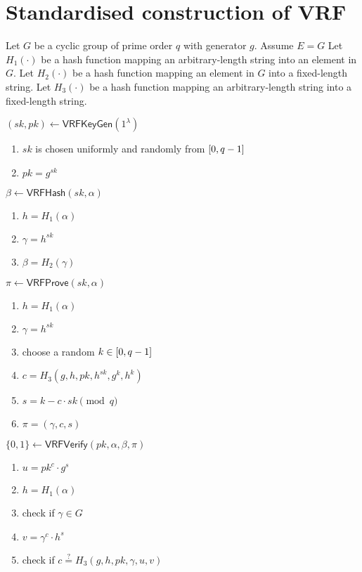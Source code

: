\section{Standardised construction of VRF}

Let $G$ be a cyclic group of prime order $q$ with generator $g$. Assume $E = G$
Let $H_1(\cdot)$ be a hash function mapping an arbitrary-length string into an element in $G$.
Let $H_2(\cdot)$ be a hash function mapping an element in $G$ into a fixed-length string.
Let $H_3(\cdot)$ be a hash function mapping an arbitrary-length string into a fixed-length string.

\noindent $(sk, pk) \gets \mathsf{VRFKeyGen}(1^{\lambda})$
\begin{enumerate}
    \item $sk$ is chosen uniformly and randomly from $\interval{0}{q-1}$
    \item $pk = g^{sk}$
\end{enumerate}

\noindent $\beta \gets \mathsf{VRFHash}(sk, \alpha)$
\begin{enumerate}
    \item $h = H_{1}(\alpha)$
    \item $\gamma = h^{sk}$
    \item $\beta = H_{2}(\gamma)$
\end{enumerate}

\noindent $\pi \gets \mathsf{VRFProve}(sk, \alpha)$
\begin{enumerate}
    \item $h = H_{1}(\alpha)$
    \item $\gamma = h^{sk}$
    \item choose a random $k \in \interval{0}{q-1}$
    \item $c = H_{3}(g, h, pk, h^{sk}, g^{k}, h^{k})$
    \item $s = k - c \cdot sk \pmod{q}$
    \item $\pi = (\gamma, c, s)$
\end{enumerate}

\noindent $\{0, 1\} \gets \mathsf{VRFVerify}(pk, \alpha, \beta, \pi)$
\begin{enumerate}
    \item $u = pk^{c} \cdot g^{s}$
    \item $h = H_{1}(\alpha)$
    \item check if $\gamma \in G$
    \item $v = \gamma^{c} \cdot h^{s}$
    \item check if $c \stackrel{?}{=} H_{3}(g, h, pk, \gamma, u, v)$
\end{enumerate}
